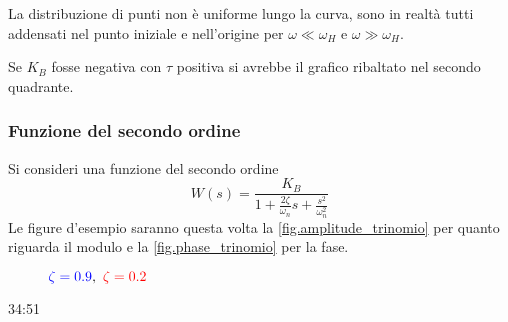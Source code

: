 La distribuzione di punti non è uniforme lungo la curva, sono in realtà tutti
addensati nel punto iniziale e nell'origine per $\omega\ll\omega_H$ e
$\omega\gg\omega_H$.

Se $K_B$ fosse negativa con $\tau$ positiva si avrebbe il grafico ribaltato nel
secondo quadrante.

\subsubsection{Funzione del secondo ordine}
Si consideri una funzione del secondo ordine
$$
W(s) = \frac{K_B}{1+\frac{2\zeta}{\omega_n}s + \frac{s^2}{\omega_n^2}}
$$
Le figure d'esempio saranno questa volta la
\ref{fig.amplitude_trinomio} per quanto riguarda il modulo e la
\ref{fig.phase_trinomio} per la fase.
\begin{figure}[h]
\centering
\def\KB{1}
\def\ZETA{0.9}
\def\ZETAA{0.2}
\caption{$\textcolor{blue}{\zeta=\ZETA},\ \textcolor{red}{\zeta=\ZETAA}$}
\end{figure}
34:51

